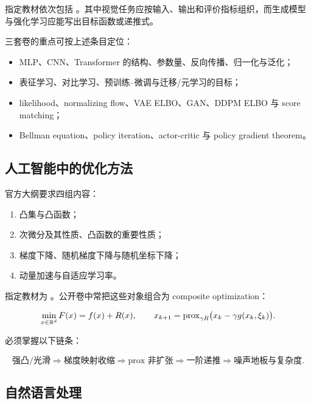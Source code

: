 \documentclass[11pt]{ctexart}
\begin{document}
指定教材依次包括 \textcite{goodfellow2016deep,bishop2023deep,bishop2006prml,szeliski2022vision}。其中视觉任务应按输入、输出和评价指标组织，而生成模型与强化学习应能写出目标函数或递推式。

三套卷的重点可按上述条目定位：

\begin{itemize}
  \item MLP、CNN、Transformer 的结构、参数量、反向传播、归一化与泛化；
  \item 表征学习、对比学习、预训练--微调与迁移/元学习的目标；
  \item likelihood、normalizing flow、VAE ELBO、GAN、DDPM ELBO 与 score matching；
  \item Bellman equation、policy iteration、actor-critic 与 policy gradient theorem。
\end{itemize}

\DeepTextbooks

\subsection{人工智能中的优化方法}

官方大纲要求四组内容：

\begin{enumerate}
  \item 凸集与凸函数；
  \item 次微分及其性质、凸函数的重要性质；
  \item 梯度下降、随机梯度下降与随机坐标下降；
  \item 动量加速与自适应学习率。
\end{enumerate}

指定教材为 \textcite{nesterov2018convex,beck2017first}。公开卷中常把这些对象组合为 composite optimization：

\[
  \min_{x\in \mathbb{R}^d} F(x) = f(x) + R(x),
  \qquad
  x_{k+1} = \operatorname{prox}_{\gamma R}\bigl(x_k-\gamma g(x_k,\xi_k)\bigr).
\]

必须掌握以下链条：

\[
  \text{强凸/光滑}
  \Longrightarrow
  \text{梯度映射收缩}
  \Longrightarrow
  \text{prox 非扩张}
  \Longrightarrow
  \text{一阶递推}
  \Longrightarrow
  \text{噪声地板与复杂度}.
\]

\OptimizationTextbooks

\subsection{自然语言处理}
\end{document}
